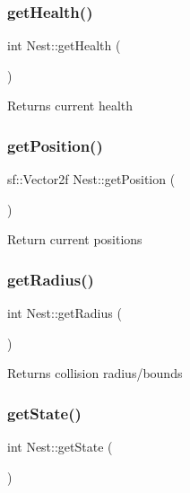 \mbox{\label{class_nest_a31a181f820acdcc53c5c0954ec57bdd2}} 
\subsubsection{\texorpdfstring{get\+Health()}{getHealth()}}
{\footnotesize\ttfamily int Nest\+::get\+Health (\begin{DoxyParamCaption}{ }\end{DoxyParamCaption})}

Returns current health \mbox{\label{class_nest_a3904c58d1826997b98bdfd8b357ba6fa}} 
\subsubsection{\texorpdfstring{get\+Position()}{getPosition()}}
{\footnotesize\ttfamily sf\+::\+Vector2f Nest\+::get\+Position (\begin{DoxyParamCaption}{ }\end{DoxyParamCaption})}

Return current positions \mbox{\label{class_nest_a83653533eadad995b464a8a068257fe8}} 
\subsubsection{\texorpdfstring{get\+Radius()}{getRadius()}}
{\footnotesize\ttfamily int Nest\+::get\+Radius (\begin{DoxyParamCaption}{ }\end{DoxyParamCaption})}

Returns collision radius/bounds \mbox{\label{class_nest_a730a5f41978e51fc1a10093014c464f5}} 
\subsubsection{\texorpdfstring{get\+State()}{getState()}}
{\footnotesize\ttfamily int Nest\+::get\+State (\begin{DoxyParamCaption}{ }\end{DoxyParamCaption})}

